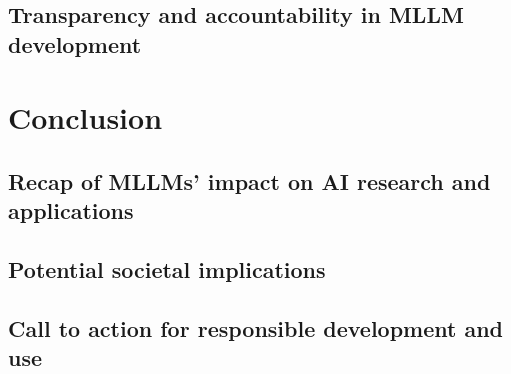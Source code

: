 \documentclass{book}
\begin{document}
\section{Transparency and accountability in MLLM development}

\chapter{Conclusion}
\section{Recap of MLLMs' impact on AI research and applications}
\section{Potential societal implications}
\section{Call to action for responsible development and use}
\end{document}
